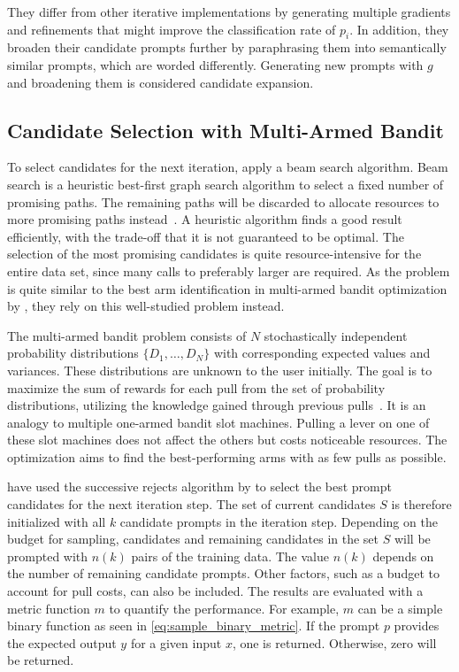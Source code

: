 They differ from other iterative implementations by generating multiple gradients and refinements that might improve the classification rate of $p_i$.
In addition, they broaden their candidate prompts further by paraphrasing them into semantically similar prompts, which are worded differently.
Generating new prompts with $g$ and broadening them is considered candidate expansion.

\subsection{Candidate Selection with Multi-Armed Bandit}
To select candidates for the next iteration, \citeauthor{pryzant2023AutomaticPrompt} apply a beam search algorithm.
Beam search is a heuristic best-first graph search algorithm to select a fixed number of promising paths.
The remaining paths will be discarded to allocate resources to more promising paths instead~\cite{BeamSearch}.
A heuristic algorithm finds a good result efficiently, with the trade-off that it is not guaranteed to be optimal.
The selection of the most promising candidates is quite resource-intensive for the entire data set, since many calls to preferably larger \LLMs are required.
As the problem is quite similar to the best arm identification in multi-armed bandit optimization by , they rely on this well-studied problem instead.

The multi-armed bandit problem consists of $N$ stochastically independent probability distributions $\{ D_1, \dots, D_N\}$ with corresponding expected values and variances.
These distributions are unknown to the user initially.
The goal is to maximize the sum of rewards for each pull from the set of probability distributions, utilizing the knowledge gained through previous pulls~\cite{kuleshov2014AlgorithmsMultiarmeda}.
It is an analogy to multiple one-armed bandit slot machines.
Pulling a lever on one of these slot machines does not affect the others but costs noticeable resources.
The optimization aims to find the best-performing arms with as few pulls as possible.

\citeauthor{pryzant2023AutomaticPrompt} have used the successive rejects algorithm by  to select the best prompt candidates for the next iteration step.
The set of current candidates $S$ is therefore initialized with all $k$ candidate prompts in the iteration step.
Depending on the budget for sampling, candidates and remaining candidates in the set $S$ will be prompted with $n(k)$ pairs of the training data.
The value $n(k)$ depends on the number of remaining candidate prompts.
Other factors, such as a budget to account for pull costs, can also be included.
The results are evaluated with a metric function $m$ to quantify the performance.
For example, $m$ can be a simple binary function as seen in \autoref{eq:sample_binary_metric}.
If the prompt $p$ provides the expected output $y$ for a given input $x$, one is returned.
Otherwise, zero will be returned.

